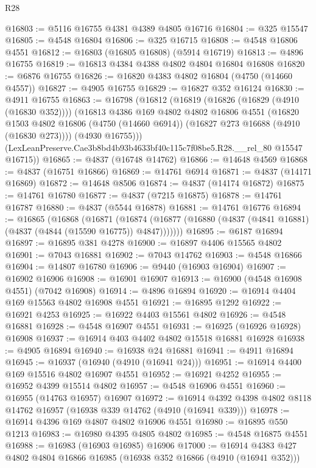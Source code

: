 \begin{lexlean}{R28}
\begin{coremodule}
@16803 := @5116 @16755 @4381 @4389 @4805 @16716
@16804 := @325 @15547
@16805 := @4548 @16804
@16806 := @325 @16715
@16808 := @4548 @16806 @4551
@16812 := @16803 (@16805 @16808) (@5914 @16719)
@16813 := @4896 @16755
@16819 := @16813 @4384 @4388 @4802 @4804 @16804 @16808
@16820 := @6876 @16755
@16826 := @16820 @4383 @4802 @16804 (@4750 (@14660 @4557))
@16827 := @4905 @16755
@16829 := @16827 @352 @16124
@16830 := @4911 @16755
@16863 := @16798
    (@16812
      (@16819
        (@16826 (@16829 (@4910 (@16830 @352))))
        (@16813
          @4386
          @169
          @4802
          @4802
          @16806
          @4551
          (@16820
            @1503
            @4802
            @16806
            (@4750 (@14660 @6914))
            (@16827 @273 @16688 (@4910 (@16830 @273))))
          (@4930 @16755)))
      (LexLeanPreserve.Cae3b8bd4b93b4633bf40c115c7f08be5.R28.__rel_80 @15547 @16715))
@16865 := @4837 (@16748 @14762)
@16866 := @14648 @4569
@16868 := @4837 (@16751 @16866)
@16869 := @14761 @6914
@16871 := @4837 (@14171 @16869)
@16872 := @14648 @8506
@16874 := @4837 (@14174 @16872)
@16875 := @14761 @16780
@16877 := @4837 (@7215 @16875)
@16878 := @14761 @16787
@16880 := @4837 (@5544 @16878)
@16881 := @14761 @16776
@16894 := @16865
    (@16868
      (@16871
        (@16874 (@16877 (@16880 (@4837 (@4841 @16881) (@4837 (@4844 (@15590 @16775)) @4847)))))))
@16895 := @6187 @16894
@16897 := @16895 @381 @4278
@16900 := @16897 @4406 @15565 @4802
@16901 := @7043 @16881
@16902 := @7043 @14762
@16903 := @4548 @16866
@16904 := @14807 @16780
@16906 := @9440 (@16903 @16904)
@16907 := @16902 @16906
@16908 := @16901 @16907
@16913 := @16900 (@4548 @16908 @4551) (@7042 @16908)
@16914 := @4896 @16894
@16920 := @16914 @4404 @169 @15563 @4802 @16908 @4551
@16921 := @16895 @1292
@16922 := @16921 @4253
@16925 := @16922 @4403 @15561 @4802
@16926 := @4548 @16881
@16928 := @4548 @16907 @4551
@16931 := @16925 (@16926 @16928) @16908
@16937 := @16914 @403 @4402 @4802 @15518 @16881 @16928
@16938 := @4905 @16894
@16940 := @16938 @24 @16881
@16941 := @4911 @16894
@16945 := @16937 (@16940 (@4910 (@16941 @24)))
@16951 := @16914 @4400 @169 @15516 @4802 @16907 @4551
@16952 := @16921 @4252
@16955 := @16952 @4399 @15514 @4802
@16957 := @4548 @16906 @4551
@16960 := @16955 (@14763 @16957) @16907
@16972 := @16914 @4392 @4398 @4802 @8118 @14762 @16957 (@16938 @339 @14762 (@4910 (@16941 @339)))
@16978 := @16914 @4396 @169 @4807 @4802 @16906 @4551
@16980 := @16895 @550 @1213
@16983 := @16980 @4395 @4805 @4802
@16985 := @4548 @16875 @4551
@16988 := @16983 (@16903 @16985) @16906
@17000 := @16914 @4383 @427 @4802 @4804 @16866 @16985 (@16938 @352 @16866 (@4910 (@16941 @352)))

\end{coremodule}
\end{lexlean}
